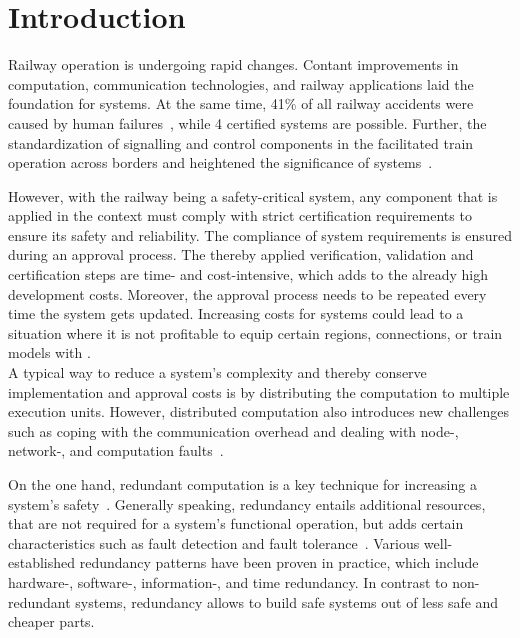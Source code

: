 \chapter{Introduction}


Railway operation is undergoing rapid changes.
%
Contant improvements in computation, communication technologies, and railway applications laid the foundation for  systems.
At the same time, 41\% of all railway accidents were caused by human failures~\cite{TODO}, while  4 certified  systems are possible.
Further, the standardization of signalling and control components in the  facilitated train operation across borders and heightened the significance of  systems~\cite{YIN2017RNDofATO}.

However, with the railway being a safety-critical system, any component that is applied in the  context must comply with strict certification requirements to ensure its safety and reliability.
The compliance of system requirements is ensured during an approval process.
The thereby applied verification, validation and certification steps are time- and cost-intensive, which adds to the already high development costs.
Moreover, the approval process needs to be repeated every time the system gets updated.
Increasing costs for  systems could lead to a situation where it is not profitable to equip certain regions, connections, or train models with .
\\

A typical way to reduce a system's complexity and thereby conserve implementation and approval costs is by distributing the computation to multiple execution units.
However, distributed computation also introduces new challenges such as coping with the communication overhead and dealing with node-, network-, and computation faults~\cite{DistributedSafety2020}.

On the one hand, redundant computation is a key technique for increasing a system's safety~\cite{TanenbaumSteen07}.
Generally speaking, redundancy entails additional resources, that are not required for a system's functional operation, but adds certain characteristics such as fault detection and fault tolerance~\cite{BarryFaultToleranceAnalysis}.
Various well-established redundancy patterns have been proven in practice, which include hardware-, software-, information-, and time redundancy.
In contrast to non-redundant systems, redundancy allows to build safe systems out of less safe and cheaper parts.

